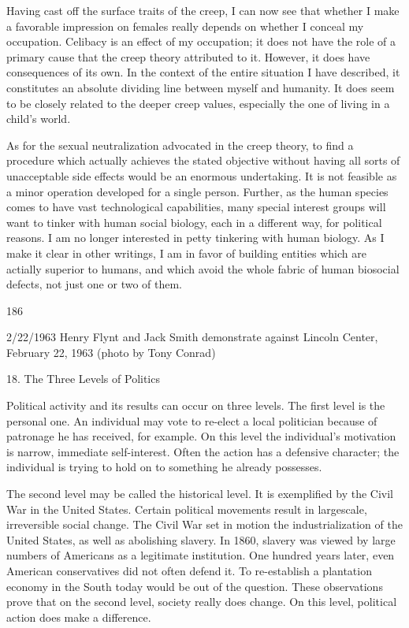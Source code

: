 \documentclass[10pt,twoside]{memoir}
\begin{document}
\begin{enumerate}
{{{Having cast off the surface traits of the creep, I can now see that 
whether I make a favorable impression on females really depends on whether 
I conceal my occupation. Celibacy is an effect of my occupation; it does not 
have the role of a primary cause that the creep theory attributed to it. 
However, it does have consequences of its own. In the context of the entire 
situation I have described, it constitutes an absolute dividing line between 
myself and humanity. It does seem to be closely related to the deeper creep 
values, especially the one of living in a child's world. 

As for the sexual neutralization advocated in the creep theory, to find a 
procedure which actually achieves the stated objective without having all 
sorts of unacceptable side effects would be an enormous undertaking. It is 
not feasible as a minor operation developed for a single person. Further, as 
the human species comes to have vast technological capabilities, many 
special interest groups will want to tinker with human social biology, each in 
a different way, for political reasons. I am no longer interested in petty 
tinkering with human biology. As I make it clear in other writings, I am in 
favor of building entities which are actially superior to humans, and which 
avoid the whole fabric of human biosocial defects, not just one or two of 
them. 


186 


2/22/1963 
Henry Flynt and Jack Smith demonstrate against Lincoln Center, February 22, 1963 
(photo by Tony Conrad) 


18. The Three Levels of Politics 


Political activity and its results can occur on three levels. The first level 
is the personal one. An individual may vote to re-elect a local politician 
because of patronage he has received, for example. On this level the 
individual's motivation is narrow, immediate self-interest. Often the action 
has a defensive character; the individual is trying to hold on to something he 
already possesses. 

The second level may be called the historical level. It is exemplified by 
the Civil War in the United States. Certain political movements result in 
largescale, irreversible social change. The Civil War set in motion the 
industrialization of the United States, as well as abolishing slavery. In 1860, 
slavery was viewed by large numbers of Americans as a legitimate institution. 
One hundred years later, even American conservatives did not often defend 
it. To re-establish a plantation economy in the South today would be out of 
the question. These observations prove that on the second level, society 
really does change. On this level, political action does make a difference. 

}}}
\end{enumerate}
\end{document}
